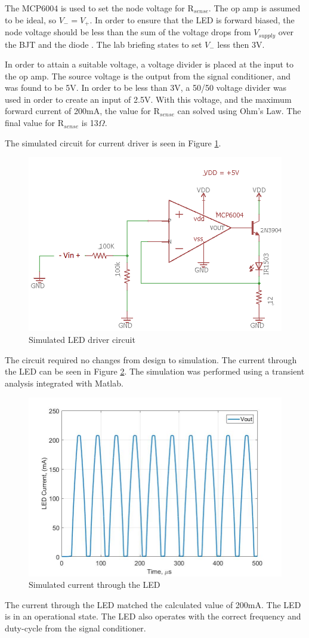 The MCP6004 is used to set the node voltage for R$_{sense}$. The op amp is assumed to be ideal, so $V_- = V_+$. In order to ensure that the LED is forward biased, the node voltage should be less than the sum of the voltage drops from $V_{supply}$ over the BJT and the diode \cite{b2}. The lab briefing \cite{b2} states to set $V_-$ less then 3V.

In order to attain a suitable voltage, a voltage divider is placed at the input to the op amp. The source voltage is the output from the signal conditioner, and was found to be 5V. In order to be less than 3V, a 50/50 voltage divider was used in order to create an input of 2.5V. With this voltage, and the maximum forward current of 200mA, the value for R$_{sense}$ can solved using Ohm's Law. The final value for R$_{sense}$ is 13$\Omega$.

The simulated circuit for current driver is seen in Figure \ref{fig:finalleddriverschem}.

\begin{figure}[H]
	\centering
	\includegraphics[width=0.6\linewidth]{CircuitDevelopment/FinalLEDdriverSChem}
	\caption[Simulated LED driver]{Simulated LED driver circuit}
	\label{fig:finalleddriverschem}
\end{figure}

The circuit required no changes from design to simulation. The current through the LED can be seen in Figure \ref{fig:simcurrentlab4}. The simulation was performed using a transient analysis integrated with Matlab.

\begin{figure}[H]
	\centering
	\includegraphics[width=0.60\linewidth]{CircuitDevelopment/sim_current_lab4}
	\caption[Simulated current]{Simulated current through the LED}
	\label{fig:simcurrentlab4}
\end{figure}

The current through the LED matched the calculated value of 200mA. The LED is in an operational state. The LED also operates with the correct frequency and duty-cycle from the signal conditioner.



